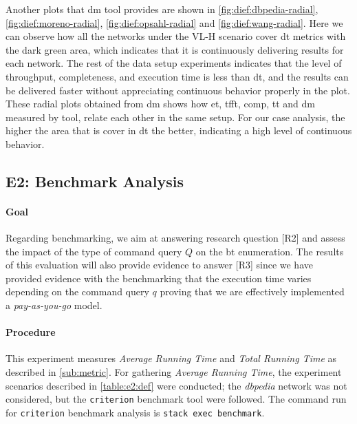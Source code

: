 Another plots that \acrshort{dm} tool provides are shown in \autoref{fig:dief:dbpedia-radial}, \autoref{fig:dief:moreno-radial}, \autoref{fig:dief:opsahl-radial} and \autoref{fig:dief:wang-radial}.
Here we can observe how all the networks under the VL-H scenario cover \acrshort{dt} metrics with the dark green area, which indicates that it is continuously delivering results for each network. 
The rest of the data setup experiments indicates that the level of throughput, completeness, and execution time is less than \acrfull{dt}, and the results can be delivered faster without appreciating continuous behavior properly in the plot. 
These radial plots obtained from \acrshort{dm} shows how \acrfull{et}, \acrfull{tfft}, \acrfull{comp}, \acrfull{tt} and \acrshort{dm} measured by tool, relate each other in the same setup. 
For our case analysis, the higher the area that is cover in \acrfull{dt} the better, indicating a high level of continuous behavior.

\subsection{E2: Benchmark Analysis}\label{sub:sec:exp-2} 
\paragraph{Goal} Regarding benchmarking, we aim at answering research question [R2] and assess  the impact of the type of command query $Q$ on the  \acrshort{bt} enumeration.
The results of this evaluation will also provide evidence to answer [R3] since we have provided evidence with the benchmarking that the execution time varies depending on the command query $q$ proving that we are effectively implemented a \emph{pay-as-you-go} model. 

\paragraph{Procedure} This experiment measures \emph{Average Running Time} and \emph{Total Running Time} as  described in \autoref{sub:metric}. 
For gathering \emph{Average Running Time}, the experiment scenarios described in \autoref{table:e2:def} were conducted; the \emph{\acrshort{dbpedia}} network was not considered, but the \texttt{criterion} \cite{criterion} benchmark tool were followed.
The command run for \texttt{criterion} benchmark analysis is \texttt{stack exec benchmark}. 

